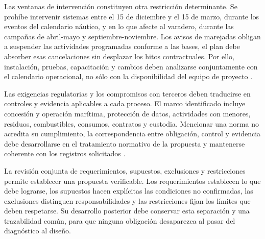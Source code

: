 Las ventanas de intervención constituyen otra restricción determinante. Se prohíbe intervenir sistemas entre el 15 de diciembre y el 15 de marzo, durante los eventos del calendario náutico, y en lo que afecte al varadero, durante las campañas de abril-mayo y septiembre-noviembre. Los avisos de marejadas obligan a suspender las actividades programadas conforme a las bases, el plan debe absorber esas cancelaciones sin desplazar los hitos contractuales. Por ello, instalación, pruebas, capacitación y cambios deben analizarse conjuntamente con el calendario operacional, no sólo con la disponibilidad del equipo de proyecto \parencite[cap.~10, p.~26; cap.~15, RT-10.05, p.~34 y RT-22.04, p.~36]{pucv-caso07-2026}.

Las exigencias regulatorias y los compromisos con terceros deben traducirse en controles y evidencia aplicables a cada proceso. El marco identificado incluye concesión y operación marítima, protección de datos, actividades con menores, residuos, combustibles, consumos, contratos y custodia. Mencionar una norma no acredita su cumplimiento, la correspondencia entre obligación, control y evidencia debe desarrollarse en el tratamiento normativo de la propuesta y mantenerse coherente con los registros solicitados \parencite[cap.~12, pp.~27-28]{pucv-caso07-2026}.

La revisión conjunta de requerimientos, supuestos, exclusiones y restricciones permite establecer una propuesta verificable. Los requerimientos establecen lo que debe lograrse, los supuestos hacen explícitas las condiciones no confirmadas, las exclusiones distinguen responsabilidades y las restricciones fijan los límites que deben respetarse. Su desarrollo posterior debe conservar esta separación y una trazabilidad común, para que ninguna obligación desaparezca al pasar del diagnóstico al diseño.

